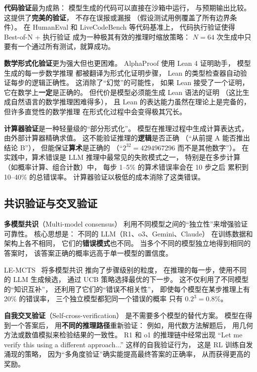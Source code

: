 \textbf{代码验证}最为成熟：
模型生成的代码可以直接在沙箱中运行，
与预期输出比较。
这提供了\textbf{完美的验证}，
不存在误报或漏报
（假设测试用例覆盖了所有边界条件）。
在 HumanEval 和 LiveCodeBench 等代码基准上，
代码执行验证使得 Best-of-N + 执行验证
成为一种极其有效的推理时缩放策略：
$N = 64$ 次生成中只要有一个通过所有测试，就算成功。

\textbf{数学形式化验证}更为强大但也更困难。
AlphaProof 使用 Lean 4 证明助手，
模型生成的每一步数学推理
都被翻译为形式化证明步骤，
Lean 的类型检查器自动验证每步的逻辑正确性。
这消除了“幻觉”的可能性，
如果 Lean 接受了一个证明，它在数学上\textbf{一定}是正确的。
但代价是模型必须能生成 Lean 语法的证明
（这比生成自然语言的数学推理困难得多），
且 Lean 的表达能力虽然在理论上是完备的，
但许多直觉性的数学推理
在形式化过程中会变得极其冗长。

\textbf{计算器验证}是一种轻量级的“部分形式化”。
模型在推理过程中生成计算表达式，
由外部计算器精确求值。
这不能验证推理的\textbf{逻辑}是否正确
（“从前提 A 能否推出结论 B”），
但能保证\textbf{算术}是正确的
（“$2^{32} = 4294967296$ 而不是其他数字”）。
在实践中，算术错误是 LLM 推理中最常见的失败模式之一，
特别是在多步计算（如概率计算、组合计数）中，
每步 1--5\% 的算术错误率会在 10 步之后
累积到 10--40\% 的总错误率。
计算器验证以极低的成本消除了这类错误。

\subsection{共识验证与交叉验证}

\textbf{多模型共识}（Multi-model consensus）
利用不同模型之间的“独立性”来增强验证可靠性。
核心思想是：
不同的 LLM（R1、o3、Gemini、Claude）
在训练数据和架构上各不相同，
它们的\textbf{错误模式}也不同。
当多个不同的模型独立地得到相同的答案时，
该答案正确的概率远高于单一模型的置信度。

LE-MCTS~\cite{park2025lemcts} 将多模型共识
推向了步骤级别的粒度，
在推理的每一步，使用不同的 LLM 生成候选，
通过 UCB 策略选择最优的下一步。
这不仅利用了不同模型的“知识互补”，
还利用了它们的“错误不相关性”，
即使每个模型在某步推理上有 20\% 的错误率，
三个独立模型都犯同一个错误的概率
只有 $0.2^3 = 0.8\%$。

\textbf{自我交叉验证}（Self-cross-verification）
是不需要多个模型的替代方案。
模型在得到一个答案后，
用\textbf{不同的推理路径}重新验证：
例如，用代数方法解题后，
用几何方法或数值模拟来检验结果的一致性。
R1 和 o1 的推理链中经常出现
“Let me verify this using a different approach...”
这样的自我验证行为，
这是 RL 训练自发涌现的策略，
因为“多角度验证”确实能提高最终答案的正确率，
从而获得更高的奖励。


